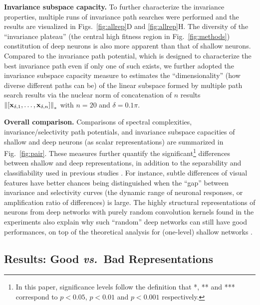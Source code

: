 \documentclass[10pt,twocolumn,letterpaper]{article}
\begin{document}
{\bf Invariance subspace capacity.} To further characterize the invariance properties, multiple runs of invariance path searches {were} performed and the results are visualized in Figs.~\ref{fig:allrep}D and \ref{fig:allrep}H.
The diversity of the ``invariance plateau'' (\eg the central high fitness region in Fig.~\ref{fig:methods}) constitution of deep neurons is also more apparent than that of shallow neurons.
Compared to the invariance path potential, which is designed to characterize the best invariance path even if only one of such exists, we further adopted the invariance subspace capacity measure to estimates the ``dimensionality'' (\ie how diverse different paths can be) of the linear subspace formed by multiple path search results via the nuclear norm of concatenation of $n$ results $\left\|\left[{\bf{x}}_{\delta,1},\dots,{\bf{x}}_{\delta,n}\right]\right\|_{*}$ with $n=20$ and $\delta=0.1\pi$.


\newcommand{\defstars}{In this paper, significance levels follow the definition that *, ** and *** correspond to $p<0.05$, $p<0.01$ and $p<0.001$ respectively.\label{fnote:defstars}}

{\bf Overall comparison.} Comparisons of spectral complexities, invariance/selectivity path potentials, and invariance subspace capacities of shallow and deep neurons (as scalar representations) are summarized in Fig.~\ref{fig:pair}.
These measures further quantify the significant\footnote{\defstars} differences between shallow and deep representations, in addition to the separability and classifiability used in previous studies \cite{donahue2014decaf, zeiler2014visualizing}.
For instance, subtle differences of visual features have better chances being distinguished when the ``gap'' between invariance and selectivity curves (\ie the dynamic range of neuronal responses, or amplification ratio of differences) is large. 
The highly structural representations of neurons from deep networks with purely random convolution kernels found in the experiments also explain why such ``random'' deep networks can still have good performances, on top of the theoretical analysis for (one-level) shallow networks \cite{saxe2011random}.


\subsection{Results: Good \textbf{\textit{vs.}}~Bad Representations}
\end{document}
